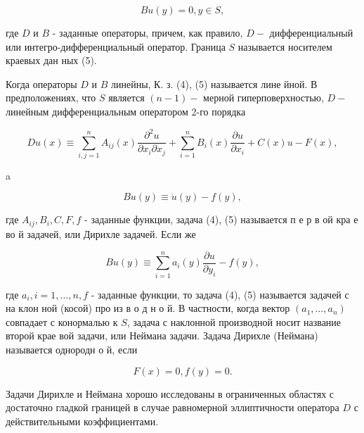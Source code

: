\documentclass[10pt]{article}
\begin{document}
\[

B u(y)=0, y \in S,

\]



где $D$ и $B$ - заданные операторы, причем, как правило, $D-$ дифференциальный или интегро-дифференциальный оператор. Граница $S$ называется носителем краевых дан ных (5).



Когда операторы $D$ и $B$ линейны, К. з. (4), (5) называется лине йной. В предположениях, что $S$ является $(n-1)-$ мерной гиперповерхностью, $D-$ линейным дифференциальным оператором 2-го порядка



\[

D u(x) \equiv \sum_{i, j=1}^{n} A_{i j}(x) \frac{\partial^{2} u}{\partial x_{i} \partial x_{j}}+\sum_{i=1}^{n} B_{i}(x) \frac{\partial u}{\partial x_{i}}+C(x) u-F(x),

\]



a



\[

B u(y) \equiv \dot{u}(y)-f(y),

\]



где $A_{i j}, B_{i}, C, F, f$ - заданные функции, задача (4), (5) называется п е р в ой кра е во й задачей, или Дирихле задачей. Если же



\[

B u(y) \equiv \sum_{i=1}^{n} a_{i}(y) \frac{\partial u}{\partial y_{i}}-f(y),

\]



где $a_{i}, i=1, \ldots, n, f$ - заданные функции, то задача (4), (5) называется задачей с на клон ной (косой) про из в о д н о й. В частности, когда вектор $\left(a_{1}, \ldots, a_{n}\right)$ совпадает с конормалью к $S$, задача с наклонной производной носит название второй крае вой задачи, или Неймана задачи. Задача Дирихле (Неймана) называется однородн о й, если



\[

F(x)=0, f(y)=0 .

\]



Задачи Дирихле и Неймана хорошо исследованы в ограниченных областях с достаточно гладкой границей в случае равномерной эллиптичности оператора $D$ с действительными коэффициентами.
\end{document}
